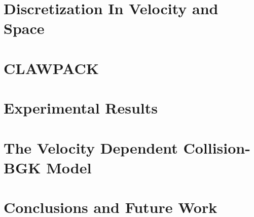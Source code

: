 \documentclass[12pt]{CSUNthesis}
\begin{document}

\chapter{Discretization In Velocity and Space}

\chapter{CLAWPACK}

\chapter{Experimental Results}

\chapter{The Velocity Dependent Collision-BGK Model}

\chapter{Conclusions and Future Work}

\appendix
\end{document}
